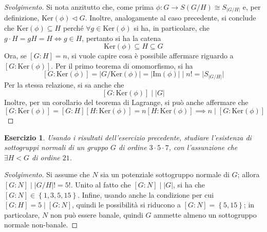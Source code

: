 \documentclass[11pt]{scrartcl}
\theoremstyle{style}
\newtheorem{esercizio}{Esercizio}[section]
\newenvironment{svolgimento}{\renewcommand\qedsymbol{$\blacksquare$}\begin{proof}[Svolgimento]}{\end{proof}}
\numberwithin{equation}{subsection}
\begin{document}
\begin{svolgimento}
	Si nota anzitutto che, come prima $\phi : G \to S(G / H) \cong S_{\lvert G / H \rvert } $ e, per definizione, $\mathrm{Ker} (\phi )\lhd G$.
	Inoltre, analogamente al caso precedente, si conclude che $\mathrm{Ker} (\phi )\subseteq H$ perch\'e $\forall  g \in \mathrm{Ker} (\phi )$ si ha, in particolare, che $g\cdot  H=gH = H \iff g \in H $, pertanto si ha la catena
	\[
	\mathrm{Ker} (\phi ) \subseteq H \subseteq G
	\] 
	Ora, se $[G:H] = n$, si vuole capire cosa \`e possibile affermare riguardo a $[G : \mathrm{Ker} (\phi )]$.
	Per il primo teorema di omomorfismo, si ha
	\[
		[G:\mathrm{Ker} (\phi )] = \lvert G / \mathrm{Ker}(\phi )  \rvert = \lvert \mathrm{Im} (\phi ) \rvert  \mid n! = \lvert S _{\lvert G / H \rvert }  \rvert 
	\] 
	Per la stessa relazione, si sa anche che 
	\[
		[G : \mathrm{Ker} (\phi )]  \mid \lvert G \rvert 
	\] 
Inoltre, per un corollario del teorema di Lagrange, si pu\`o anche affermare che 
\[
	[G : \mathrm{Ker} (\phi )] = [G : H] [H:\mathrm{Ker} (\phi )] = n [H : \mathrm{Ker} (\phi )]\implies n  \mid [G : \mathrm{Ker} (\phi )]
\] 
\end{svolgimento}
\begin{esercizio}
	Usando i risultati dell'esercizio precedente, studiare l'esistenza di sottogruppi normali di un gruppo $G$ di ordine $3\cdot 5 \cdot 7$, con l'assunzione che $\exists  H < G$ di ordine $21$.
\end{esercizio}
\begin{svolgimento}
	Si assume che $N$ sia un potenziale sottogruppo normale di $G$; allora $[G:N]  \mid \lvert G / H  \rvert ! = 5!$.
	Unito al fatto che $[G:N] \mid \lvert G \rvert $, si ha che $[G : N] \in  \left\{ 1,3,5,15 \right\} $.
	Infine, usando anche la condizione per cui $[G:H] = 5 \mid [G : N]$, quindi le possibilit\`a si riducono a $[G:N] = \left\{ 5,15 \right\} $; in particolare, $N$ non pu\`o essere banale, quindi $G$ ammette almeno un sottogruppo normale non-banale.
\end{svolgimento}
\end{document}
